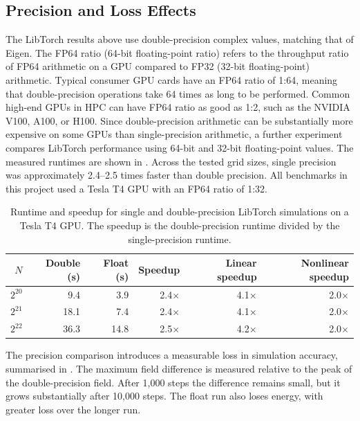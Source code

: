 \subsection{Precision and Loss Effects}

The LibTorch results above use double-precision complex values, matching that of Eigen. 
The FP64 ratio (64-bit floating-point ratio) refers to the throughput ratio of FP64 arithmetic on a GPU
compared to FP32 (32-bit floating-point) arithmetic. Typical consumer GPU cards have an FP64 ratio of 1:64,
meaning that double-precision operations take 64 times as long to be performed.
Common high-end GPUs in HPC can have FP64 ratio as good as 1:2, such as the NVIDIA V100, A100, or H100.
Since double-precision arithmetic can be substantially more expensive on some GPUs than single-precision arithmetic,
a further experiment compares LibTorch performance using 64-bit and 32-bit floating-point
values. The measured runtimes are shown in . Across the tested
grid sizes, single precision was approximately 2.4--2.5 times faster than double precision.
All benchmarks in this project used a Tesla T4 GPU with an FP64 ratio of 1:32.

\begin{table}[H]
  \centering
  \caption{Runtime and speedup for single and double-precision LibTorch simulations on a
  Tesla T4 GPU. The speedup is the double-precision runtime divided by the single-precision
  runtime.}
  \label{tab:precision-speedup}
  \begin{tabular}{rrrrrr}
    \toprule
    $N$ & Double (s) & Float (s) & Speedup & Linear speedup & Nonlinear speedup \\
    \midrule
    $2^{20}$ & 9.4 & 3.9 & 2.4$\times$ & 4.1$\times$ & 2.0$\times$ \\
    $2^{21}$ & 18.1 & 7.4 & 2.4$\times$ & 4.1$\times$ & 2.0$\times$ \\
    $2^{22}$ & 36.3 & 14.8 & 2.5$\times$ & 4.2$\times$ & 2.0$\times$ \\
    \bottomrule
  \end{tabular}
\end{table}

The precision comparison introduces a measurable loss in simulation accuracy, summarised in
. The maximum field difference is measured relative to the peak
of the double-precision field. After 1,000 steps the difference remains small, but it grows
substantially after 10,000 steps. The float run also loses energy, with greater loss over the
longer run.

